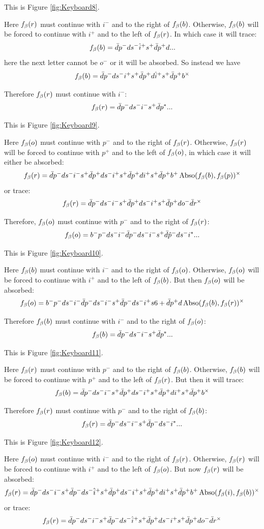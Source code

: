This is Figure \ref{fig:Keyboard8}.

Here $f_\beta(r)$ must continue with $i^-$ and to the right of $f_\beta(b)$. Otherwise, $f_\beta(b)$ will be forced to continue with $i^+$ and to the left of $f_\beta(r)$. In which case it will trace:
\[
f_\beta(b) = \bar{d} p^- d s^- \hat{i}^+ s^+ \bar{d} p^+ d...
\]
here the next letter cannot be $o^-$ or it will be absorbed. So instead we have
\[
f_\beta(b) = \bar{d} p^- d s^- i^+ s^+ \bar{d} p^+ d \hat{i}^+ s^+ \bar{d} p^+ b^\times
\]

Therefore $f_\beta(r)$ must continue with $i^-$:
\[
f_\beta(r) = \bar{d} p^- d s^- i^- s^+ \bar{d} p^*...
\]

This is Figure \ref{fig:Keyboard9}.

Here $f_\beta(o)$ must continue with $p^-$ and to the right of $f_\beta(r)$. Otherwise, $f_\beta(r)$ will be forced to continue with $p^+$ and to the left of $f_\beta(o)$, in which case it will either be absorbed:
\[
f_\beta(r) = \bar{d} p^- d s^- i^- s^+ \bar{d} p^+ d s^- i^+ s^+ \bar{d} p^+ d i^+ s^+ \bar{d} p^+ b^+ \operatorname{Abso}(f_\beta(b), f_\beta(p))^\times
\]
or trace:
\[
f_\beta(r) = \bar{d} p^- d s^- i^- s^+ \bar{d} p^+ d s^- i^+ s^+ \bar{d} p^+ d o^- \bar{d} r^\times
\]

Therefore, $f_\beta(o)$ must continue with $p^-$ and to the right of $f_\beta(r)$:
\[
f_\beta(o) = b^- p^- d s^- i^- \bar{d} p^- d s^- i^- s^+ \bar{d} \hat{p}^- d s^- i^*...
\]

This is Figure \ref{fig:Keyboard10}.

Here $f_\beta(b)$ must continue with $i^-$ and to the right of $f_\beta(o)$. Otherwise, $f_\beta(o)$ will be forced to continue with $i^+$ and to the left of $f_\beta(b)$. But then $f_\beta(o)$ will be absorbed:
\[
f_\beta(o) = b^- p^- d s^- i^- \bar{d} p^- d s^- i^- s^+ \bar{d} p^- d s^- i^+ s6+ \bar{d} p^+ d \operatorname{Abso}(f_\beta(b), f_\beta(r))^\times
\]

Therefore $f_\beta(b)$ must continue with $i^-$ and to the right of $f_\beta(o)$:
\[
f_\beta(b) = \bar{d} p^- d s^- i^- s^+ \bar{d} p^*...
\]

This is Figure \ref{fig:Keyboard11}.


Here $f_\beta(r)$ must continue with $p^-$ and to the right of $f_\beta(b)$. Otherwise, $f_\beta(b)$ will be forced to continue with $p^+$ and to the left of $f_\beta(r)$. But then it will trace:
\[
f_\beta(b) = \bar{d} p^- d s^- i^- s^+ \bar{d} p^+ d s^- i^+ s^+ \bar{d} p^+ d i^+ s^+ \bar{d} p^+ b^\times
\]

Therefore $f_\beta(r)$ must continue with $p^-$ and to the right of $f_\beta(b)$:
\[
f_\beta(r) = \bar{d} p^- d s^- i^- s^+ \bar{d} p^- d s^- i^*...
\]

This is Figure \ref{fig:Keyboard12}.

Here $f_\beta(o)$ must continue with $i^-$ and to the right of $f_\beta(r)$. Otherwise, $f_\beta(r)$ will be forced to continue with $i^+$ and to the left of $f_\beta(o)$. But now $f_\beta(r)$ will be absorbed:
\[
f_\beta(r) = \bar{d} p^- d s^- i^- s^+ \bar{d} p^- d s^- \hat{i}^+ s^+ \bar{d} p^+ d s^- i^+ s^+ \bar{d} p^+ d i^+ s^+ \bar{d} p^+ b^+ \operatorname{Abso}(f_\beta(i), f_\beta(b))^\times
\]
or trace:
\[
f_\beta(r) = \bar{d} p^- d s^- i^- s^+ \bar{d} p^- d s^- \hat{i}^+ s^+ \bar{d} p^+ d s^- i^+ s^+ \bar{d} p^+ d o^- \bar{d} r^\times
\]

